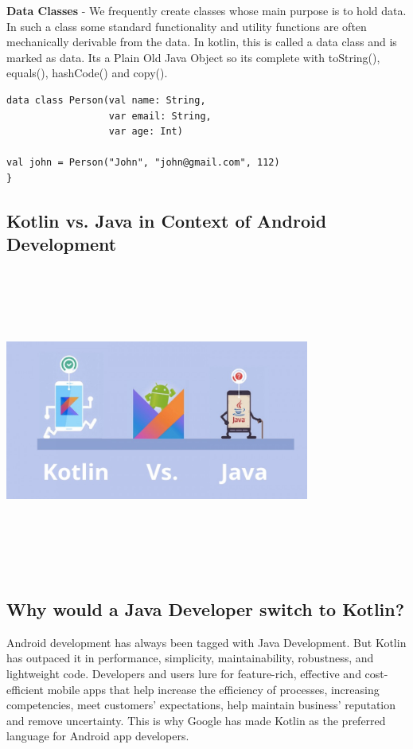 \textbf{Data Classes} - We frequently create classes whose main purpose is to hold data. In such a class some standard functionality and utility functions are often mechanically derivable from the data. In kotlin, this is called a data class and is marked as data. Its a Plain Old Java Object so its complete with toString(), equals(), hashCode() and copy().
\begin{verbatim}
data class Person(val name: String,
                  var email: String,
                  var age: Int)

val john = Person("John", "john@gmail.com", 112)
}
\end{verbatim}
\subsection{Kotlin vs. Java in Context of Android Development}
\par
\medskip
\begin{center}
    \includegraphics[width=10cm,height=10cm,keepaspectratio]{Images/KotlinvJava.jpg}
\end{center}

\subsection{Why would a Java Developer switch to Kotlin?}
Android development has always been tagged with Java Development. But Kotlin has outpaced it in performance, simplicity, maintainability, robustness, and lightweight code. Developers and users lure for feature-rich, effective and cost-efficient mobile apps that help increase the efficiency of processes, increasing competencies, meet customers’ expectations, help maintain business’ reputation and remove uncertainty. This is why Google has made Kotlin as the preferred language for Android app developers.\newline

